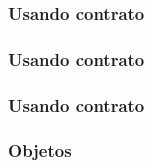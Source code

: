 \documentclass[14pt]{beamer}
\begin{document}
\frame
{
  \frametitle{Usando contrato}

  \usebox{\listingboxi}
}

\newsavebox{\listingboxj}
\begin{lrbox}{\listingboxj}

\end{lrbox}

\frame
{
  \frametitle{Usando contrato}

  \usebox{\listingboxj}
}

\newsavebox{\listingboxk}
\begin{lrbox}{\listingboxk}

\end{lrbox}

\newsavebox{\listingboxl}
\begin{lrbox}{\listingboxl}

\end{lrbox}

\frame
{
  \frametitle{Usando contrato}

  \usebox{\listingboxk}
  \usebox{\listingboxl}
}

\frame
{
  \frametitle{Objetos}

  
}
\end{document}

